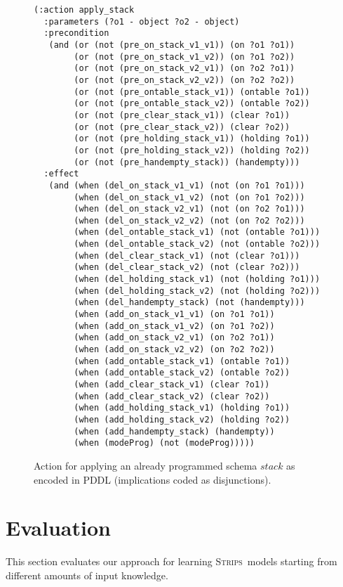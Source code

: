 \documentclass{article}
\newcommand{\strips}{\textsc{Strips}}     %
\begin{document}
\begin{figure}
\begin{scriptsize}
\begin{verbatim}
(:action apply_stack
  :parameters (?o1 - object ?o2 - object)
  :precondition
   (and (or (not (pre_on_stack_v1_v1)) (on ?o1 ?o1))
        (or (not (pre_on_stack_v1_v2)) (on ?o1 ?o2))
        (or (not (pre_on_stack_v2_v1)) (on ?o2 ?o1))
        (or (not (pre_on_stack_v2_v2)) (on ?o2 ?o2))
        (or (not (pre_ontable_stack_v1)) (ontable ?o1))
        (or (not (pre_ontable_stack_v2)) (ontable ?o2))
        (or (not (pre_clear_stack_v1)) (clear ?o1))
        (or (not (pre_clear_stack_v2)) (clear ?o2))
        (or (not (pre_holding_stack_v1)) (holding ?o1))
        (or (not (pre_holding_stack_v2)) (holding ?o2))
        (or (not (pre_handempty_stack)) (handempty)))
  :effect
   (and (when (del_on_stack_v1_v1) (not (on ?o1 ?o1)))
        (when (del_on_stack_v1_v2) (not (on ?o1 ?o2)))
        (when (del_on_stack_v2_v1) (not (on ?o2 ?o1)))
        (when (del_on_stack_v2_v2) (not (on ?o2 ?o2)))
        (when (del_ontable_stack_v1) (not (ontable ?o1)))
        (when (del_ontable_stack_v2) (not (ontable ?o2)))
        (when (del_clear_stack_v1) (not (clear ?o1)))
        (when (del_clear_stack_v2) (not (clear ?o2)))
        (when (del_holding_stack_v1) (not (holding ?o1)))
        (when (del_holding_stack_v2) (not (holding ?o2)))
        (when (del_handempty_stack) (not (handempty)))
        (when (add_on_stack_v1_v1) (on ?o1 ?o1))
        (when (add_on_stack_v1_v2) (on ?o1 ?o2))
        (when (add_on_stack_v2_v1) (on ?o2 ?o1))
        (when (add_on_stack_v2_v2) (on ?o2 ?o2))
        (when (add_ontable_stack_v1) (ontable ?o1))
        (when (add_ontable_stack_v2) (ontable ?o2))
        (when (add_clear_stack_v1) (clear ?o1))
        (when (add_clear_stack_v2) (clear ?o2))
        (when (add_holding_stack_v1) (holding ?o1))
        (when (add_holding_stack_v2) (holding ?o2))
        (when (add_handempty_stack) (handempty))
        (when (modeProg) (not (modeProg)))))
\end{verbatim}
\end{scriptsize}
 \caption{\small Action for applying an already programmed schema $stack$ as encoded in PDDL (implications coded as disjunctions).}
\label{fig:compilation}
\end{figure}


\section{Evaluation}
This section evaluates our approach for learning \strips\ models starting from different amounts of input knowledge.
\end{document}
